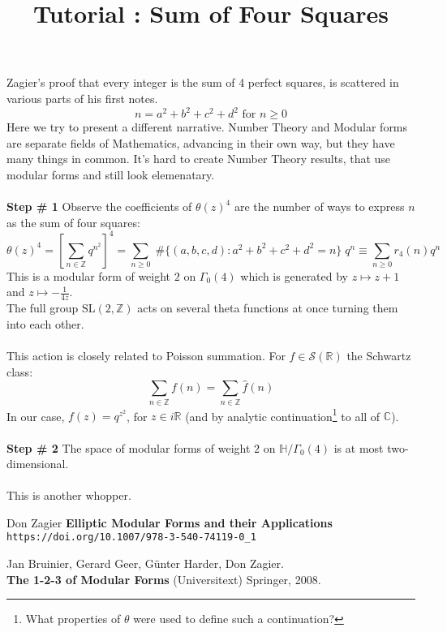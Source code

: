 \documentclass[12pt]{article}
\title{Tutorial : Sum of Four Squares}
\date{}
\begin{document}
\selectfont \fontsize{12.5}{15}\selectfont

\maketitle

\noindent Zagier's proof that every integer is the sum of 4 perfect squares, is scattered in various parts of his first notes. 
$$ n = a^2 + b^2 + c^2 + d^2 \text{ for } n \geq 0$$
Here we try to present a different narrative.  Number Theory and Modular forms are separate fields of Mathematics, advancing in their own way, but they have many things in common. It's hard to create Number Theory results, that use modular forms and still look elemenatary. \\ \\
\textbf{Step \# 1} Observe the coefficients of $\theta(z)^4$ are the number of ways to express $n$ as the sum of four squares:
$$ \theta(z)^4 = \left[ \sum_{n \in \mathbb{Z}}  q^{n^2} \right]^4 = \sum_{n \geq 0}\; 
\#\Big\{ (a,b,c,d): a^2 + b^2 + c^2 + d^2 = n  \Big\} \; q^n
\equiv \sum_{n \geq 0} r_4(n) q^n $$
This is a modular form of weight $2$ on $\Gamma_0(4)$ which is generated by $z \mapsto z + 1$ and $z \mapsto  - \frac{1}{4z}$. \\
The full group $\text{SL}(2, \mathbb{Z})$ acts on several theta functions at once turning them into each other. \\ \\
This action is closely related to Poisson summation.  For $f \in \mathcal{S}(\mathbb{R})$ the Schwartz class:
$$ \sum_{n \in \mathbb{Z}} f(n) = \sum_{n \in \mathbb{Z}} \hat{f}(n) $$
In our case, $f(z) = q^{z^2}$, for $z \in i \mathbb{R}$ (and by analytic continuation\footnote{What properties of $\theta$ were used to define such a continuation?} to all of $\mathbb{C}$). \\ \\
\textbf{Step \# 2} The space of modular forms of weight $2$ on $\mathbb{H}/\Gamma_0(4)$ is at most two-dimensional. \\ \\
This is another whopper.

\vfill

\begin{thebibliography}{}


\item Don Zagier \textbf{Elliptic Modular Forms and their Applications} \\ \texttt{https://doi.org/10.1007/978-3-540-74119-0\_1}

\item Jan Bruinier, Gerard Geer, G\"{u}nter Harder, Don Zagier. \\ \textbf{The 1-2-3 of Modular Forms} (Universitext) Springer, 2008.


\end{thebibliography}
\end{document}
